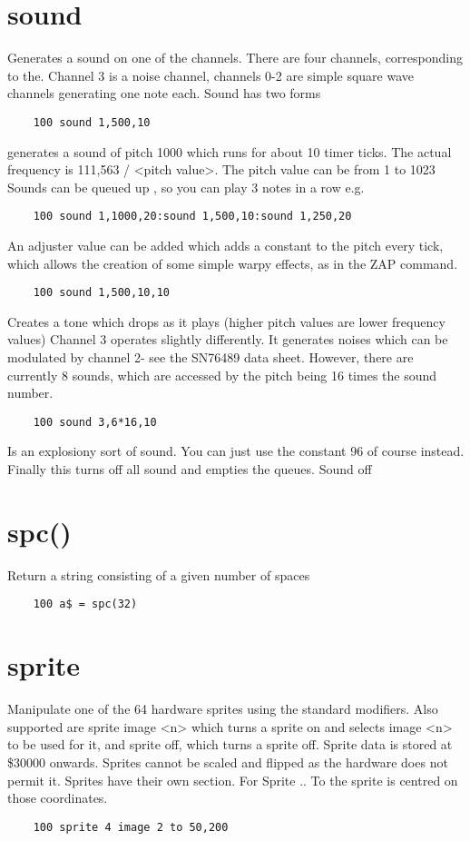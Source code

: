 \section*{sound}
Generates a sound on one of the channels. There are four channels, corresponding to the. Channel 3 is a noise channel, channels 0-2 are simple square wave channels generating one note each. 
Sound has two forms
\example{}
\begin{verbatim}
	100 sound 1,500,10
\end{verbatim}
generates a sound of pitch 1000 which runs for about 10 timer ticks. The actual frequency is 111,563 / <pitch value>. The pitch value can be from 1 to 1023
Sounds can be queued up , so you can play 3 notes in a row e.g.
\example{}
\begin{verbatim}
	100 sound 1,1000,20:sound 1,500,10:sound 1,250,20
\end{verbatim}
An adjuster value can be added which adds a constant to the pitch every tick, which allows the creation of some simple warpy effects, as in the ZAP command.
\example{}
\begin{verbatim}
	100 sound 1,500,10,10
\end{verbatim}
Creates a tone which drops as it plays (higher pitch values are lower frequency values)
Channel 3 operates slightly differently. It generates noises which can be modulated by channel 2- see the SN76489 data sheet.
However, there are currently 8 sounds, which are accessed by the pitch being 16 times the sound number.
\example{}
\begin{verbatim}
	100 sound 3,6*16,10
\end{verbatim}
Is an explosiony sort of sound. You can just use the constant 96 of course instead.
Finally this turns off all sound and empties the queues.
Sound off

\section*{spc()}
Return a string consisting of a given number of spaces
\example{}
\begin{verbatim}
	100 a$ = spc(32)
\end{verbatim}

\section*{sprite}
Manipulate one of the 64 hardware sprites using the standard modifiers. Also supported are sprite image <n> which turns a sprite on and selects image <n> to be used for it, and sprite off, which turns a sprite off. Sprite data is stored at \$30000 onwards. Sprites cannot be scaled and flipped as the hardware does not permit it. Sprites have their own section. For Sprite .. To the sprite is centred on those coordinates.
\example{}
\begin{verbatim}
	100 sprite 4 image 2 to 50,200
\end{verbatim}

